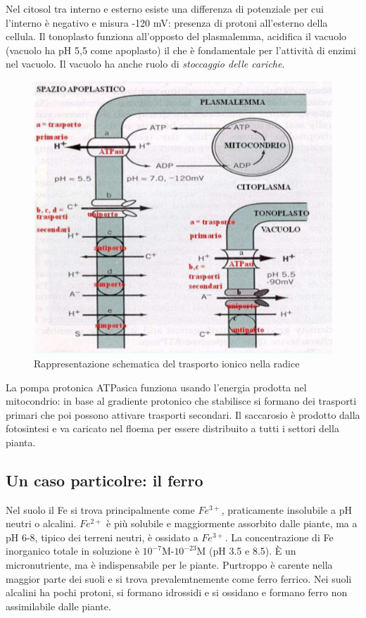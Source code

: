 \documentclass[a4paper,12pt]{book}
\begin{document}
Nel citosol tra interno e esterno esiste una differenza di potenziale per cui l'interno è  negativo e misura -120 mV: presenza di protoni all'esterno della cellula. Il tonoplasto funziona  all'opposto del plasmalemma, acidifica il vacuolo (vacuolo ha pH 5,5 come apoplasto) il che è fondamentale per l'attività di enzimi nel vacuolo. Il vacuolo ha anche ruolo di \emph{stoccaggio delle cariche}. 
\begin{figure}[H]
\centering
\includegraphics[scale=0.4]{immagini/trasporto.jpg}
\caption{Rappresentazione schematica del trasporto ionico nella radice}
\end{figure}
La pompa protonica ATPasica funziona usando l'energia prodotta nel mitocondrio: in base al gradiente protonico che stabilisce si formano dei trasporti primari che poi possono attivare trasporti secondari.
Il saccarosio è prodotto dalla fotosintesi e va caricato nel floema per essere distribuito a tutti i settori della pianta.

\subsection{Un caso particolre: il ferro}
Nel suolo il Fe si trova principalmente come $Fe^{3+}$, praticamente insolubile a pH neutri o alcalini.
$Fe^{2+}$ è più solubile e maggiormente assorbito dalle piante, ma a pH 6-8, tipico dei terreni
neutri, è ossidato a $Fe^{3+}$.
La concentrazione di Fe inorganico totale in soluzione è $10^{-7}$M-$10^{-23}$M (pH 3.5 e 8.5).
È un micronutriente, ma è indispensabile per le piante. Purtroppo è carente nella maggior parte dei suoli e si trova prevalemtnemente come ferro ferrico. 
Nei suoli alcalini ha pochi protoni, si formano idrossidi e si ossidano e formano ferro non assimilabile dalle piante. 
\end{document}
